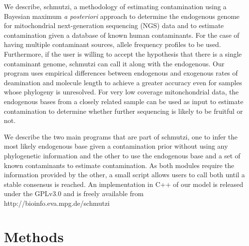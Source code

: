 \documentclass[a4paper,12pt]{article}
\begin{document}
We describe, schmutzi, a methodology of estimating contamination using a Bayesian maximum {\it a posteriori} approach to determine the endogenous genome for mitochondrial next-generation sequencing (NGS) data and to estimate contamination given a database of known human contaminants. For the case of having multiple contaminant sources, allele frequency profiles to be used. Furthermore, if the user is willing to accept the hypothesis that there is a single contaminant genome, schmutzi can call it along with the endogenous. Our program uses empirical differences between endogenous and exogenous rates of deamination and molecule length to achieve a greater accuracy even for samples whose phylogeny is unresolved. For very low coverage mitonchondrial data, the endogenous bases from a closely related sample can be used as input to estimate contamination to determine whether further sequencing is likely to be fruitful or not.

We describe the two main programs that are part of schmutzi, one to infer the most likely endogenous base given a contamination prior without using any phylogenetic information and the other to use the endogenous base and a set of known contaminants to estimate contamination. As both modules require the information provided by the other, a small script allows users to call both until a stable consensus is reached. An implementation in C++ of our model is released under the GPLv3.0 and is freely available from http://bioinfo.eva.mpg.de/schmutzi



\section{Methods}
\end{document}
